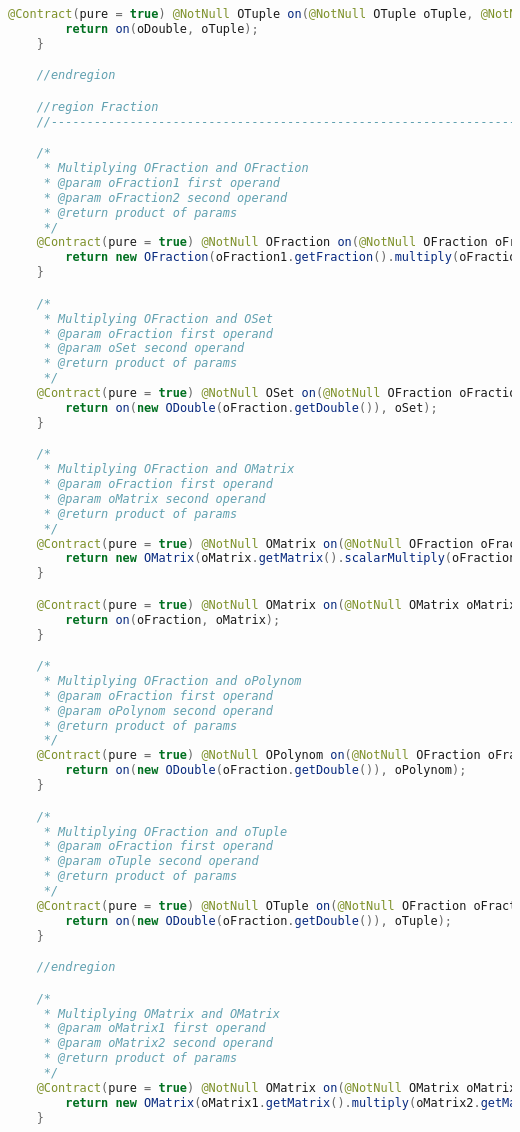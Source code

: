 \begin{lstlisting}[caption=Times (Falk),label=list:Times,language=Java]
    @Contract(pure = true) @NotNull OTuple on(@NotNull OTuple oTuple, @NotNull ODouble oDouble) {
        return on(oDouble, oTuple);
    }

    //endregion

    //region Fraction
    //------------------------------------------------------------------------------------

    /*
     * Multiplying OFraction and OFraction
     * @param oFraction1 first operand
     * @param oFraction2 second operand
     * @return product of params
     */
    @Contract(pure = true) @NotNull OFraction on(@NotNull OFraction oFraction1, @NotNull OFraction oFraction2) {
        return new OFraction(oFraction1.getFraction().multiply(oFraction2.getFraction()));
    }

    /*
     * Multiplying OFraction and OSet
     * @param oFraction first operand
     * @param oSet second operand
     * @return product of params
     */
    @Contract(pure = true) @NotNull OSet on(@NotNull OFraction oFraction, @NotNull OSet oSet) {
        return on(new ODouble(oFraction.getDouble()), oSet);
    }

    /*
     * Multiplying OFraction and OMatrix
     * @param oFraction first operand
     * @param oMatrix second operand
     * @return product of params
     */
    @Contract(pure = true) @NotNull OMatrix on(@NotNull OFraction oFraction, @NotNull OMatrix oMatrix) {
        return new OMatrix(oMatrix.getMatrix().scalarMultiply(oFraction.getDouble()));
    }

    @Contract(pure = true) @NotNull OMatrix on(@NotNull OMatrix oMatrix, @NotNull OFraction oFraction) {
        return on(oFraction, oMatrix);
    }

    /*
     * Multiplying OFraction and oPolynom
     * @param oFraction first operand
     * @param oPolynom second operand
     * @return product of params
     */
    @Contract(pure = true) @NotNull OPolynom on(@NotNull OFraction oFraction, @NotNull OPolynom oPolynom) {
        return on(new ODouble(oFraction.getDouble()), oPolynom);
    }

    /*
     * Multiplying OFraction and oTuple
     * @param oFraction first operand
     * @param oTuple second operand
     * @return product of params
     */
    @Contract(pure = true) @NotNull OTuple on(@NotNull OFraction oFraction, @NotNull OTuple oTuple) {
        return on(new ODouble(oFraction.getDouble()), oTuple);
    }

    //endregion

    /*
     * Multiplying OMatrix and OMatrix
     * @param oMatrix1 first operand
     * @param oMatrix2 second operand
     * @return product of params
     */
    @Contract(pure = true) @NotNull OMatrix on(@NotNull OMatrix oMatrix1, @NotNull OMatrix oMatrix2) {
        return new OMatrix(oMatrix1.getMatrix().multiply(oMatrix2.getMatrix()));
    }


\end{lstlisting}
